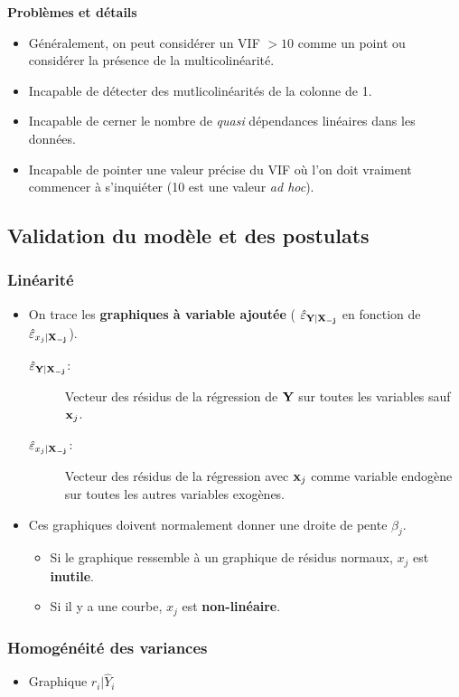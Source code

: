 \documentclass[10pt, french]{article}
\begin{document}
\begin{multicols*}{3}
\textbf{Problèmes et détails}
\begin{itemize}
	\item Généralement, on peut considérer un VIF $> 10$ comme un point ou considérer la présence de la multicolinéarité.
	\item Incapable de détecter des mutlicolinéarités de la colonne de 1.
	\item Incapable de cerner le nombre de \textit{quasi} dépendances linéaires dans les données.
	\item Incapable de pointer une valeur précise du VIF où l'on doit vraiment commencer à s'inquiéter (10 est une valeur \textit{ad hoc}).
\end{itemize}

\subsection*{Validation du modèle et des postulats}
\subsubsection*{Linéarité}
\begin{itemize}
\item On trace les \textbf{graphiques à variable ajoutée} ( $\hat{\varepsilon}_{\mathbf{Y} | \mathbf{X_{-j}}}$ en fonction de $\hat{\varepsilon}_{x_j | \mathbf{X_{-j}}}$).
\begin{description}
	\item[$\hat{\varepsilon}_{\mathbf{Y} | \mathbf{X_{-j}}}$: ] Vecteur des résidus de la régression de $\mathbf{Y}$ sur toutes les variables sauf $\mathbf{x}_{j}$.
	\item[$\hat{\varepsilon}_{x_j | \mathbf{X_{-j}}}$: ] Vecteur des résidus de la régression avec $\mathbf{x}_j$ comme variable endogène sur toutes les autres variables exogènes.
\end{description}
\item Ces graphiques doivent normalement donner une droite de pente $\beta_j$.
\begin{itemize}
	\item Si le graphique ressemble à un graphique de résidus normaux, $x_j$ est \textbf{inutile}.
	\item Si il y a une courbe, $x_j$ est \textbf{non-linéaire}.
\end{itemize}
\end{itemize}

\subsubsection*{Homogénéité des variances}
\begin{itemize}
\item Graphique $r_i | \hat{Y}_i$
\end{itemize}


\end{multicols*}
\end{document}
